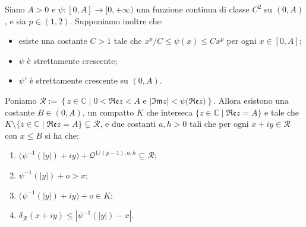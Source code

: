 \begin{lm} \label{psierre}
    Siano $A>0$ e $\psi:[0,A]\longrightarrow[0,+\infty)$ una funzione continua di classe $C^2$ su $(0,A)$, e sia $p\in(1,2)$. Supponiamo inoltre che:
    \begin{itemize}
        \item esiste una costante $C>1$ tale che $x^p/C\le\psi(x)\le Cx^p$ per ogni $x\in[0,A]$;
        \item $\psi$ è strettamente crescente;
        \item $\psi'$ è strettamente crescente su $(0,A)$.
    \end{itemize}

    Poniamo $\mathcal{R}:=\left\{z\in\mathbb{C}\mid 0<\mathfrak{Re}z<A\text{ e }|\mathfrak{Im}z|<\psi\bigl(\mathfrak{Re}z\bigr)\right\}$. Allora esistono una costante $B\in(0,A)$, un compatto $K$ che interseca $\{z\in\mathbb{C}\mid\mathfrak{Re}z=A\}$ e tale che $K\setminus\{z\in\mathbb{C}\mid\mathfrak{Re}z=A\}\subsetneq\mathcal{R}$, e due costanti $a,h>0$ tali che per ogni $x+iy\in\mathcal{R}$ con $x\le B$ si ha che:
    \begin{enumerate}[label={(\arabic*)}]
        \item $\bigl(\psi^{-1}(|y|)+iy\bigr)+\mathcal{Q}^{1/(p-1),a,h}\subseteq\mathcal{R}$;
        \item $\psi^{-1}(|y|)+o>x$;
        \item $\bigl(\psi^{-1}(|y|)+iy\bigr)+o\in K$;
        \item $\delta_{\mathcal{R}}(x+iy) \le |\psi^{-1}(|y|)-x|$.
    \end{enumerate}
\end{lm}

